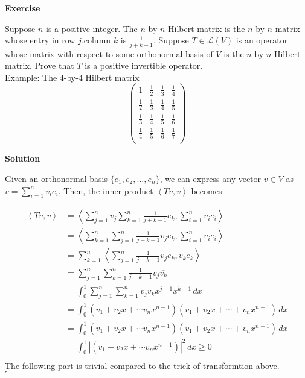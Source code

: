 \documentclass{article}
\newenvironment{exercise}{%
{\textbf{Exercise\\}
    }
}{
}
\newenvironment{solution}{%
{
    \textbf{Solution\\}
    }
}{
  \hfill $\square$ 
  \par\bigskip 
}
\begin{document}
\begin{CJK}{UTF8}{gkai}
\begin{exercise}
    Suppose $n$ is a positive integer. The $n$-by-$n$ Hilbert matrix is the $n$-by-$n$ matrix whose entry in row $j$,column $k$ is $\frac{1}{j + k - 1}$. Suppose $T\in\mathcal{L}(V)$ is an operator whose matrix with respect to some orthonormal basis of $V$ is the $n$-by-$n$ Hilbert matrix. Prove that $T$ is a positive invertible operator.\\

    Example: The $4$-by-$4$ Hilbert matrix
    \[\begin{pmatrix}
        1 & \frac{1}{2}&\frac{1}{3}&\frac{1}{4}\\
        \frac{1}{2} & \frac{1}{3}&\frac{1}{4}&\frac{1}{5}\\
        \frac{1}{3} & \frac{1}{4}&\frac{1}{5}&\frac{1}{6}\\
        \frac{1}{4} & \frac{1}{5}&\frac{1}{6}&\frac{1}{7}\\
    \end{pmatrix}\]
\end{exercise}

\begin{solution}
    Given an orthonormal basis $\{e_1, e_2, \ldots, e_n\}$, we can express any vector $v \in V$ as $v = \sum_{i=1}^{n} v_i e_i$. Then, the inner product $\left< Tv, v \right>$ becomes:
    
    \[
    \begin{aligned}
        \left< Tv, v \right> &= \left< \sum_{j=1}^{n}v_j \sum_{k=1}^{n} \frac{1}{j + k - 1} e_k, \sum_{i=1}^{n} v_i e_i \right> \\
        &= \left<  \sum_{k=1}^{n}\sum_{j=1}^{n}\frac{1}{j + k - 1} v_j e_k, \sum_{i=1}^{n} v_i e_i \right> \\
        &= \sum_{k=1}^{n}\left< \sum_{j=1}^{n}\frac{1}{j + k - 1} v_j e_k, v_k e_k \right> \\
        &= \sum_{j=1}^{n} \sum_{k=1}^{n} \frac{1}{j + k - 1} v_j \overline{v_k}\\
        &= \int_{0}^{1} \sum_{j=1}^{n} \sum_{k=1}^{n}  v_j \overline{v_k} x^{j- 1} x^{k - 1} \, dx\\
        &= \int_{0}^{1} (v_1 + v_2 x + \cdots v_n x^{n - 1})(\overline{v_1} + \overline{v_2} x + \cdots + \overline{v_n}x^{n - 1})\, dx\\
        &= \int_{0}^{1} (v_1 + v_2 x + \cdots v_n x^{n - 1})\overline{(v_1 + v_2 x + \cdots + v_n x^{n - 1})}\, dx\\
        &= \int_{0}^{1} \left|(v_1 + v_2 x + \cdots v_n x^{n - 1})\right|^2\, dx \geq 0\\
    \end{aligned}    
    \]
    The following part is trivial compared to the trick of transformtion above.\\


\end{solution}
\end{CJK}
\end{document}
